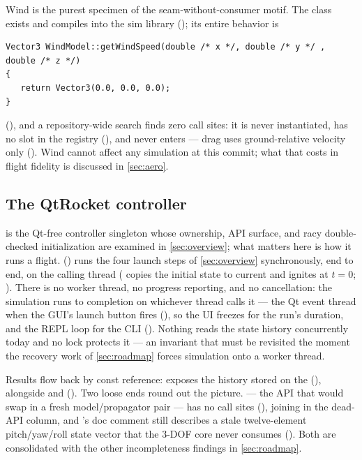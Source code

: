 Wind is the purest specimen of the seam-without-consumer motif. The class exists and compiles into
the sim library (); its entire behavior is

\begin{verbatim}
Vector3 WindModel::getWindSpeed(double /* x */, double /* y */ , double /* z */)
{
   return Vector3(0.0, 0.0, 0.0);
}
\end{verbatim}

\noindent (), and a repository-wide search finds zero call sites: it is
never instantiated, has no slot in the  registry
(), and never enters  --- drag uses ground-relative
velocity only (). Wind cannot affect any simulation at this
commit; what that costs in flight fidelity is discussed in \cref{sec:aero}.

\subsection{The QtRocket controller}\label{sec:sim-controller}

 is the Qt-free controller singleton whose ownership, API surface, and racy
double-checked initialization are examined in \cref{sec:overview}; what matters here is how it
runs a flight.  () runs the four launch steps of
\cref{sec:overview} synchronously, end to end, on the calling thread
( copies the initial state to current and ignites at $t=0$;
). There is no worker thread, no progress reporting, and no cancellation:
the simulation runs to completion on whichever thread calls it --- the Qt event thread when the
GUI's launch button fires (), so the UI freezes for the run's
duration, and the REPL loop for the CLI (). Nothing reads the state history
concurrently today and no lock protects it --- an invariant that must be revisited the moment the
recovery work of \cref{sec:roadmap} forces simulation onto a worker thread.

Results flow back by const reference:  exposes the 
history stored on the  (), alongside
 and  (). Two
loose ends round out the picture.  --- the API that would swap in a fresh
model/propagator pair --- has no call sites (), joining
 in the dead-API column, and 's doc comment still
describes a stale twelve-element pitch/yaw/roll state vector that the 3-DOF core never consumes
(). Both are consolidated with the other incompleteness findings in
\cref{sec:roadmap}.
